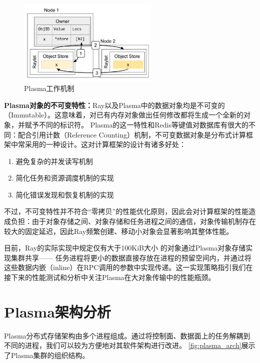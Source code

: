 \begin{figure}[h] 
    \centering
    \includegraphics[width=0.6\textwidth]{image/chap02/object_fetch.png}
    \caption{Plasma工作机制}
    \label{fig:object_fetch}
\end{figure}

\textbf{Plasma对象的不可变特性：}Ray以及Plasma中的数据对象均是不可变的（Immutable）。这意味着，对已有内存对象做出任何修改都将生成一个全新的对象，并赋予不同的标识符。
Plasma的这一特性和Redis等键值对数据库有很大的不同：配合引用计数（Reference Counting）机制，不可变数据对象是分布式计算框架中常采用的一种设计。这对计算框架的设计有诸多好处：

\begin{enumerate}
    \item 避免复杂的并发读写机制
    \item 简化任务和资源调度机制的实现
    \item 简化错误发现和恢复机制的实现
\end{enumerate}

不过，不可变特性并不符合“零拷贝”的性能优化原则，因此会对计算框架的性能造成负担：由于对象存储之间、对象存储和任务进程之间的通信，对象传输机制存在较大的固定延迟，因此Ray频繁创建、移动小对象会显著影响其整体性能。

目前，Ray的实际实现中规定仅有大于100KiB大小
\cite{ray_whitepaper}的对象通过Plasma对象存储实现集群共享——
任务进程将更小的数据直接存放在进程的预留空间内，并通过将这些数据内嵌（inline）在RPC调用的参数中实现传递。这一实现策略指引我们在接下来的性能测试和分析中关注Plasma在大对象传输中的性能瓶颈。

\section{Plasma架构分析}
\label{sec:plasma_arch}

Plasma分布式存储架构由多个进程组成。通过将控制面、数据面上的任务解耦到不同的进程，我们可以较为方便地对其软件架构进行改进。
\autoref{fig:plasma_arch}展示了Plasma集群的组织结构。

